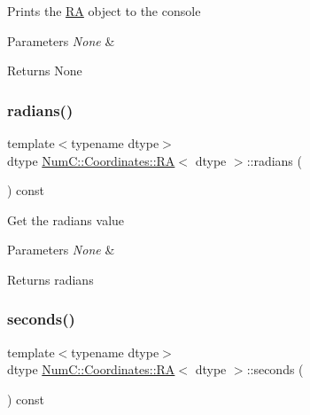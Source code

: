 Prints the \mbox{\hyperlink{class_num_c_1_1_coordinates_1_1_r_a}{RA}} object to the console


\begin{DoxyParams}{Parameters}
{\em None} & \\
\hline
\end{DoxyParams}
\begin{DoxyReturn}{Returns}
None 
\end{DoxyReturn}
\mbox{\label{class_num_c_1_1_coordinates_1_1_r_a_a6e4a8e6d1dd6556d215759757f1d46f2}} 
\subsubsection{\texorpdfstring{radians()}{radians()}}
{\footnotesize\ttfamily template$<$typename dtype$>$ \\
dtype \mbox{\hyperlink{class_num_c_1_1_coordinates_1_1_r_a}{Num\+C\+::\+Coordinates\+::\+RA}}$<$ dtype $>$\+::radians (\begin{DoxyParamCaption}{ }\end{DoxyParamCaption}) const\hspace{0.3cm}{\ttfamily [inline]}}

Get the radians value


\begin{DoxyParams}{Parameters}
{\em None} & \\
\hline
\end{DoxyParams}
\begin{DoxyReturn}{Returns}
radians 
\end{DoxyReturn}
\mbox{\label{class_num_c_1_1_coordinates_1_1_r_a_aa6f63b4ebee9854019a42c523f7981f3}} 
\subsubsection{\texorpdfstring{seconds()}{seconds()}}
{\footnotesize\ttfamily template$<$typename dtype$>$ \\
dtype \mbox{\hyperlink{class_num_c_1_1_coordinates_1_1_r_a}{Num\+C\+::\+Coordinates\+::\+RA}}$<$ dtype $>$\+::seconds (\begin{DoxyParamCaption}{ }\end{DoxyParamCaption}) const\hspace{0.3cm}{\ttfamily [inline]}}

